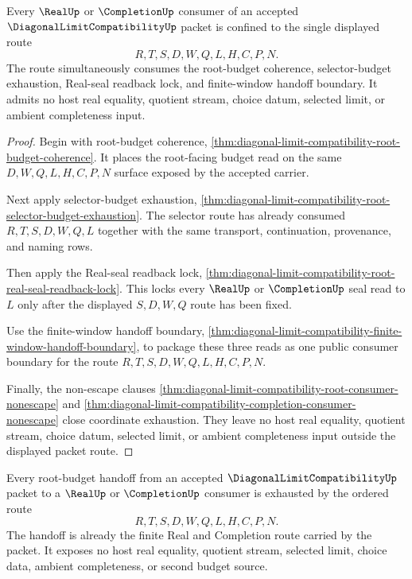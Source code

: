 \begin{theorem}
\label{thm:diagonal-limit-compatibility-root-budget-public-boundary}
Every $\RealUp$ or $\CompletionUp$ consumer of an accepted
$\DiagonalLimitCompatibilityUp$ packet is confined to the single displayed
route
$$
R,T,S,D,W,Q,L,H,C,P,N.
$$
The route simultaneously consumes the root-budget coherence, selector-budget
exhaustion, Real-seal readback lock, and finite-window handoff boundary. It
admits no host real equality, quotient stream, choice datum, selected limit, or
ambient completeness input.
\end{theorem}
\begin{proof}
Begin with root-budget coherence,
\autoref{thm:diagonal-limit-compatibility-root-budget-coherence}. It places the
root-facing budget read on the same $D,W,Q,L,H,C,P,N$ surface exposed by the
accepted carrier.

Next apply selector-budget exhaustion,
\autoref{thm:diagonal-limit-compatibility-root-selector-budget-exhaustion}. The
selector route has already consumed $R,T,S,D,W,Q,L$ together with the same
transport, continuation, provenance, and naming rows.

Then apply the Real-seal readback lock,
\autoref{thm:diagonal-limit-compatibility-root-real-seal-readback-lock}. This
locks every $\RealUp$ or $\CompletionUp$ seal read to $L$ only after the
displayed $S,D,W,Q$ route has been fixed.

Use the finite-window handoff boundary,
\autoref{thm:diagonal-limit-compatibility-finite-window-handoff-boundary}, to
package these three reads as one public consumer boundary for the route
$R,T,S,D,W,Q,L,H,C,P,N$.

Finally, the non-escape clauses
\autoref{thm:diagonal-limit-compatibility-root-consumer-nonescape} and
\autoref{thm:diagonal-limit-compatibility-completion-consumer-nonescape} close
coordinate exhaustion. They leave no host real equality, quotient stream,
choice datum, selected limit, or ambient completeness input outside the
displayed packet route.
\end{proof}

\begin{theorem}
\label{thm:diagonal-limit-compatibility-root-budget-handoff-totality}
Every root-budget handoff from an accepted
$\DiagonalLimitCompatibilityUp$ packet to a $\RealUp$ or $\CompletionUp$
consumer is exhausted by the ordered route
$$
R,T,S,D,W,Q,L,H,C,P,N.
$$
The handoff is already the finite Real and Completion route carried by the
packet. It exposes no host real equality, quotient stream, selected limit,
choice data, ambient completeness, or second budget source.
\end{theorem}


